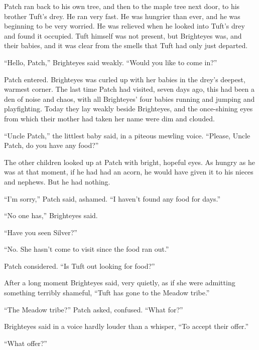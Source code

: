 \documentclass[ebook,oneside,openany,17pt]{memoir}
\newenvironment{tolerant}[1]{%
  \par\tolerance=#1\relax
}{%
  \par
}
\begin{document}
Patch ran back to his own tree, and then to the maple tree next door,
to his brother Tuft’s drey. He ran very fast. He was hungrier than
ever, and he was beginning to be very worried. He was relieved when he
looked into Tuft’s drey and found it occupied. Tuft himself was not
present, but Brighteyes was, and their babies, and it was clear from
the smells that Tuft had only just departed.

“Hello, Patch,” Brighteyes said weakly. “Would you like to come in?”

\begin{tolerant}{1500}
Patch entered. Brighteyes was curled up with her babies in the drey’s
deepest, warmest corner. The last time Patch had visited, seven days
ago, this had been a den of noise and chaos, with all Brighteyes’ four
babies running and jumping and playfighting. Today they lay weakly
beside Brighteyes, and the once-shining eyes from which their mother
had taken her name were dim and clouded.
\end{tolerant}

“Uncle Patch,” the littlest baby said, in a piteous mewling
voice. “Please, Uncle Patch, do you have any food?”

The other children looked up at Patch with bright, hopeful eyes. As
hungry as he was at that moment, if he had had an acorn, he would have
given it to his nieces and nephews. But he had nothing.

“I’m sorry,” Patch said, ashamed. “I haven’t found any food for days.”

“No one has,” Brighteyes said.

“Have you seen Silver?”

“No. She hasn’t come to visit since the food ran out.”

Patch considered. “Is Tuft out looking for food?”

\begin{tolerant}{1500}
After a long moment Brighteyes said, very quietly, as if she were
admitting something terribly shameful, “Tuft has gone to the Meadow
tribe.”
\end{tolerant}

\begin{tolerant}{5000}
“The Meadow tribe?” Patch asked, confused. “What for?”
\end{tolerant}

Brighteyes said in a voice hardly louder than a whisper, “To accept
their offer.”

“What offer?”
\end{document}
